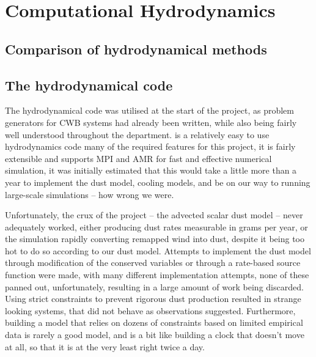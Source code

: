 \section{Computational Hydrodynamics}
\label{sec:hydrodynamics}

\subsection{Comparison of hydrodynamical methods}


\subsection{The \mg{} hydrodynamical code}


The \mg{} hydrodynamical code was utilised at the start of the project, as problem generators for CWB systems had already been written, while also being fairly well understood throughout the department.
\mg{} is a relatively easy to use hydrodynamics code many of the required features for this project, it is fairly extensible and supports MPI and AMR for fast and effective numerical simulation, it was initially estimated that this would take a little more than a year to implement the dust model, cooling models, and be on our way to running large-scale simulations -- how wrong we were.


Unfortunately, the crux of the project -- the advected scalar dust model -- never adequately worked, either producing dust rates measurable in grams per year, or the simulation rapidly converting remapped wind into dust, despite it being too hot to do so according to our dust model.
Attempts to implement the dust model through modification of the conserved variables or through a rate-based source function were made, with many different implementation attempts, none of these panned out, unfortunately, resulting in a large amount of work being discarded.
Using strict constraints to prevent rigorous dust production resulted in strange looking systems, that did not behave as observations suggested.
Furthermore, building a model that relies on dozens of constraints based on limited empirical data is rarely a good model, and is a bit like building a clock that doesn't move at all, so that it is at the very least right twice a day.

